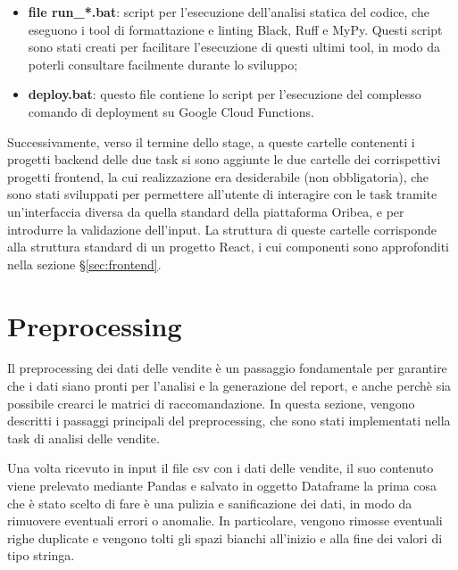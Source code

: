 \begin{itemize}
    \item \textbf{file run\_*.bat}: script per l'esecuzione dell'analisi statica del codice, che eseguono i tool di formattazione e linting Black, Ruff e MyPy. Questi script sono stati creati per facilitare l'esecuzione di questi ultimi tool, in modo da poterli consultare facilmente durante lo sviluppo;
    \item \textbf{deploy.bat}: questo file contiene lo script per l'esecuzione del complesso comando di deployment su Google Cloud Functions.
\end{itemize}

Successivamente, verso il termine dello stage, a queste cartelle contenenti i progetti backend delle due task si sono aggiunte le due cartelle dei corrispettivi progetti frontend, la cui realizzazione era desiderabile (non obbligatoria), che sono stati sviluppati per permettere all'utente di interagire con le task tramite un'interfaccia diversa da quella standard della piattaforma Oribea, e per introdurre la validazione dell'input. La struttura di queste cartelle corrisponde alla struttura standard di un progetto React, i cui componenti sono approfonditi nella sezione \S\ref{sec:frontend}.



\section{Preprocessing}
\label{sec:preprocessing}

Il preprocessing dei dati delle vendite è un passaggio fondamentale per garantire che i dati siano pronti per l'analisi e la generazione del report, e anche perchè sia possibile crearci le matrici di raccomandazione.
In questa sezione, vengono descritti i passaggi principali del preprocessing, che sono stati implementati nella task di analisi delle vendite.

Una volta ricevuto in input il file csv con i dati delle vendite, il suo contenuto viene prelevato mediante Pandas e salvato in oggetto Dataframe la prima cosa che è stato scelto di fare è una pulizia e sanificazione dei dati, in modo da rimuovere eventuali errori o anomalie. In particolare, vengono rimosse eventuali righe duplicate e vengono tolti gli spazi bianchi all'inizio e alla fine dei valori di tipo stringa.

